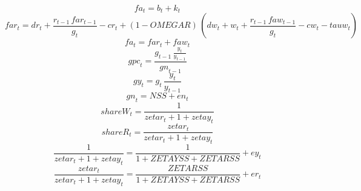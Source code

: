 \begin{dmath}
{fa}_{t}={b}_{t}+{k}_{t}
\end{dmath}
\begin{dmath}
{far}_{t}={dr}_{t}+\frac{{r}_{t-1}\, {far}_{t-1}}{{g}_{t}}-{cr}_{t}+\left(1-{OMEGAR}\right)\, \left({dw}_{t}+{w}_{t}+\frac{{r}_{t-1}\, {faw}_{t-1}}{{g}_{t}}-{cw}_{t}-{tauw}_{t}\right)
\end{dmath}
\begin{dmath}
{fa}_{t}={far}_{t}+{faw}_{t}
\end{dmath}
\begin{dmath}
{gpc}_{t}=\frac{{g}_{t-1}\, \frac{{y}_{t}}{{y}_{t-1}}}{{gn}_{t-1}}
\end{dmath}
\begin{dmath}
{gy}_{t}={g}_{t}\, \frac{{y}_{t}}{{y}_{t-1}}
\end{dmath}
\begin{dmath}
{gn}_{t}={NSS}+{en}_{t}
\end{dmath}
\begin{dmath}
{shareW}_{t}=\frac{1}{{zetar}_{t}+1+{zetay}_{t}}
\end{dmath}
\begin{dmath}
{shareR}_{t}=\frac{{zetar}_{t}}{{zetar}_{t}+1+{zetay}_{t}}
\end{dmath}
\begin{dmath}
\frac{1}{{zetar}_{t}+1+{zetay}_{t}}=\frac{1}{1+{ZETAYSS}+{ZETARSS}}+{ey}_{t}
\end{dmath}
\begin{dmath}
\frac{{zetar}_{t}}{{zetar}_{t}+1+{zetay}_{t}}=\frac{{ZETARSS}}{1+{ZETAYSS}+{ZETARSS}}+{er}_{t}
\end{dmath}
